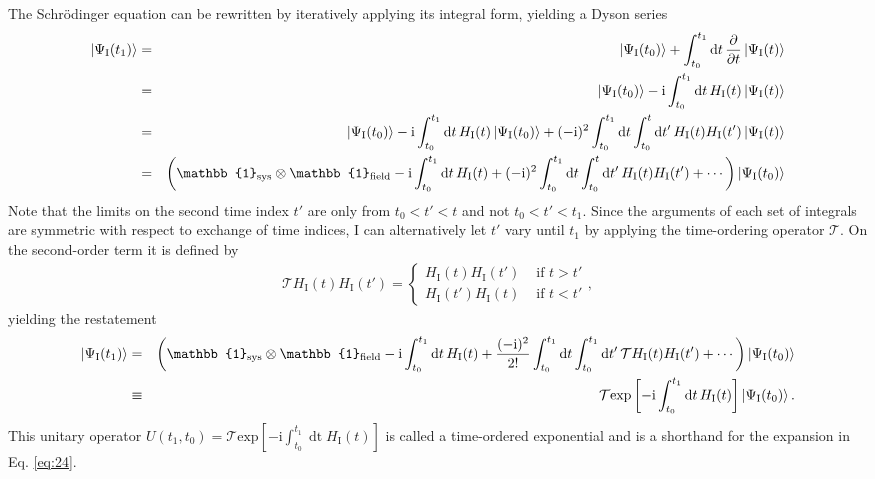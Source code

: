 \documentclass[%
 onecolumn,
 notitlepage,
 longbibliography,
 amsmath,amssymb,
 aps,
 pra,
 10pt,
]{revtex4-1}
\begin{document}
The Schr\"{o}dinger equation can be rewritten by iteratively applying its integral form, yielding a Dyson series
\begin{eqnarray}
\ket{\Psi_\textrm{I}(t_1)}&=&\ket{\Psi_\textrm{I}(t_0)}+\int_{t_0}^{t_1}\mathop{\text{d}t}\frac{\partial}{\partial t}\ket{\Psi_\textrm{I}(t)}\\
&=&\ket{\Psi_\textrm{I}(t_0)}-\textrm{i}\int_{t_0}^{t_1}\mathop{\text{d}t}H_\textrm{I}(t)\ket{\Psi_\textrm{I}(t)}\\
&=&\ket{\Psi_\textrm{I}(t_0)}-\textrm{i}\int_{t_0}^{t_1}\mathop{\text{d}t}H_\textrm{I}(t)\ket{\Psi_\textrm{I}(t_0)}+(-\text{i})^2\int_{t_0}^{t_1}\mathop{\text{d}t}\int_{t_0}^{t}\mathop{\text{d}t'}H_\textrm{I}(t)H_\textrm{I}(t')\ket{\Psi_\textrm{I}(t)}\\
&=&\left(\mathbb{1}_\text{sys}\otimes \mathbb{1}_\text{field}-\textrm{i}\int_{t_0}^{t_1}\mathop{\text{d}t}H_\textrm{I}(t)+(-\text{i})^2\int_{t_0}^{t_1}\mathop{\text{d}t}\int_{t_0}^{t}\mathop{\text{d}t'}H_\textrm{I}(t)H_\textrm{I}(t')+\cdots\right)\ket{\Psi_\textrm{I}(t_0)}
\end{eqnarray}
Note that the limits on the second time index $t'$ are only from $t_0<t'<t$ and not $t_0<t'<t_1$. Since the arguments of each set of integrals are symmetric with respect to exchange of time indices, I can alternatively let $t'$ vary until $t_1$ by applying the time-ordering operator $\mathcal{T}$. On the second-order term it is defined by
\begin{eqnarray}
\mathcal{T}H_\textrm{I}(t)H_\textrm{I}(t')=\begin{cases}
H_\textrm{I}(t)H_\textrm{I}(t')&\text{ if } t>t'\\
H_\textrm{I}(t')H_\textrm{I}(t)&\text{ if } t<t'
\end{cases},
\end{eqnarray}
yielding the restatement
\begin{eqnarray}
\ket{\Psi_\textrm{I}(t_1)}&=&\left(\mathbb{1}_\text{sys}\otimes \mathbb{1}_\text{field}-\textrm{i}\int_{t_0}^{t_1}\mathop{\text{d}t}H_\textrm{I}(t)+\frac{(-\text{i})^2}{2!}\int_{t_0}^{t_1}\mathop{\text{d}t}\int_{t_0}^{t_1}\mathop{\text{d}t'}\mathcal{T}H_\textrm{I}(t)H_\textrm{I}(t')+\cdots\right)\ket{\Psi_\textrm{I}(t_0)}\label{eq:24}\\
&\equiv&\mathcal{T}\text{exp}\left[-\text{i}\int_{t_0}^{t_1}\mathop{\text{d}t} H_\textrm{I}(t)\right]\ket{\Psi_\textrm{I}(t_0)}.
\end{eqnarray}
This unitary operator $U(t_1,t_0)=\mathcal{T}\text{exp}\left[-\text{i}\int_{t_0}^{t_1}\mathop{\text{d}t} H_\textrm{I}(t)\right]$ is called a time-ordered exponential and is a shorthand for the expansion in Eq. \ref{eq:24}.
\end{document}
